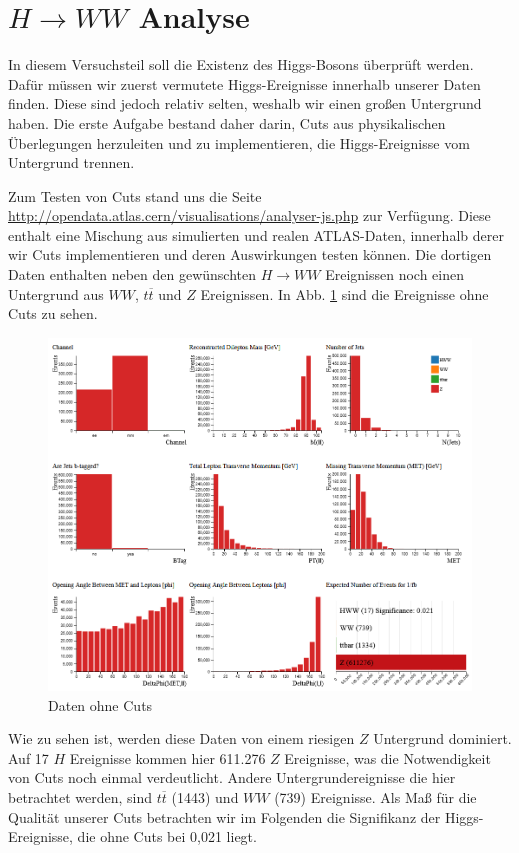\section{$H \rightarrow WW$ Analyse}

In diesem Versuchsteil soll die Existenz des Higgs-Bosons überprüft werden.
Dafür müssen wir zuerst vermutete Higgs-Ereignisse innerhalb unserer Daten finden.
Diese sind jedoch relativ selten, weshalb wir einen großen Untergrund haben.
Die erste Aufgabe bestand daher darin, Cuts aus physikalischen Überlegungen herzuleiten und zu implementieren, die Higgs-Ereignisse vom Untergrund trennen.

Zum Testen von Cuts stand uns die Seite \url{http://opendata.atlas.cern/visualisations/analyser-js.php} zur Verfügung.
Diese enthalt eine Mischung aus simulierten und realen ATLAS-Daten, innerhalb derer wir Cuts implementieren und deren Auswirkungen testen können.
Die dortigen Daten enthalten neben den gewünschten $H \rightarrow WW$ Ereignissen noch einen Untergrund aus $WW$, $t\overline{t}$ und $Z$ Ereignissen.
In Abb. \ref{test_nocuts} sind die Ereignisse ohne Cuts zu sehen.


\begin{figure}[h]
\includegraphics[width=\linewidth]{../Pictures/Auswertung/test_nocuts.png}
\caption{Daten ohne Cuts \cite{opendata}}
\label{test_nocuts}
\end{figure}

\clearpage

Wie zu sehen ist, werden diese Daten von einem riesigen $Z$ Untergrund dominiert.
Auf 17 $H$ Ereignisse kommen hier 611.276 $Z$ Ereignisse, was die Notwendigkeit von Cuts noch einmal verdeutlicht.
Andere Untergrundereignisse die hier betrachtet werden, sind $t\overline{t}$ (1443) und $WW$ (739) Ereignisse.
Als Maß für die Qualität unserer Cuts betrachten wir im Folgenden die Signifikanz der Higgs-Ereignisse, die ohne Cuts bei 0,021 liegt.

